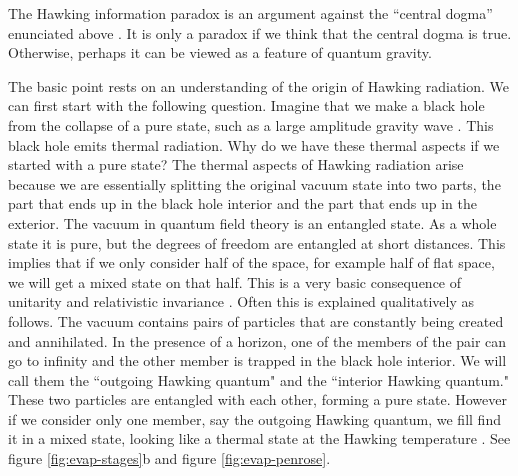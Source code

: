 The   Hawking information paradox is an argument against the ``central dogma'' enunciated above \cite{Hawking:1976ra}. It is only a  paradox if we think that the central dogma is true.
 Otherwise, perhaps it can be viewed as a feature of quantum gravity.   

The basic point rests on an understanding of the origin of Hawking radiation. We can first start with the following question. Imagine that we make a black hole from the collapse of a pure state, such as a large amplitude gravity wave \cite{Christodoulou:2008nj}. This black hole emits thermal radiation. Why do we have these thermal aspects if we started with a pure state? The thermal aspects of Hawking radiation arise because we are essentially splitting the original vacuum state into two parts, the part that ends up in the black hole interior and the part that ends up in the exterior. The vacuum in quantum field theory is an entangled state. As a whole state it is pure, but the degrees of freedom are entangled at short distances. This implies that if we only consider half of the space, for example half of flat space, we will get a mixed state on that half. This is a very basic consequence of unitarity and relativistic invariance \cite{Bisognano:1976za}. 
 Often this is explained qualitatively as follows. The vacuum contains pairs of particles that are constantly being created and annihilated. In the presence of a horizon, one of the members of the pair can go to infinity and the other member is trapped in the black hole interior.  We will call them the ``outgoing Hawking quantum" and the ``interior Hawking quantum."  These two particles are entangled with each other, forming a pure state. However if we consider only one member, say the outgoing Hawking quantum, we fill find it in a mixed state, looking like a thermal state at the Hawking temperature . See figure \ref{fig:evap-stages}b and figure \ref{fig:evap-penrose}.
 
